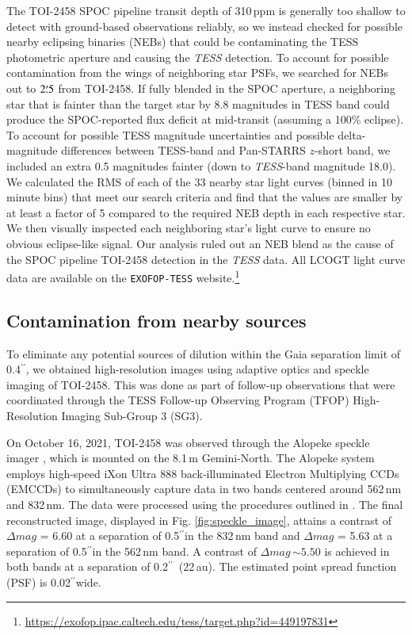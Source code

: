 \documentclass[traditabstract,longauth]{aa}
\providecommand{\arcsec}{$^{\prime \prime}$}
\begin{document}
The TOI-2458 SPOC pipeline transit depth of 310\,ppm is generally too shallow to detect with ground-based observations reliably, so we instead checked for possible nearby eclipsing binaries (NEBs) that could be contaminating the TESS photometric aperture and causing the \textit{TESS} detection. To account for possible contamination from the wings of neighboring star PSFs, we searched for NEBs out to $2\overset{\prime}{.}5$ from TOI-2458. If fully blended in the SPOC aperture, a neighboring star that is fainter than the target star by 8.8 magnitudes in TESS band could produce the SPOC-reported flux deficit at mid-transit (assuming a 100\% eclipse). To account for possible TESS magnitude uncertainties and possible delta-magnitude differences between TESS-band and Pan-STARRS $z$-short band, we included an extra 0.5 magnitudes fainter (down to \textit{TESS}-band magnitude 18.0). We calculated the RMS of each of the 33 nearby star light curves (binned in 10 minute bins) that meet our search criteria and find that the values are smaller by at least a factor of 5 compared to the required NEB depth in each respective star. We then visually inspected each neighboring star's light curve to ensure no obvious eclipse-like signal. Our analysis ruled out an NEB blend as the cause of the SPOC pipeline TOI-2458 detection in the \textit{TESS} data. All LCOGT light curve data are available on the {\tt EXOFOP-TESS} website.\footnote{\href{https://exofop.ipac.caltech.edu/tess/target.php?id=449197831}{https://exofop.ipac.caltech.edu/tess/target.php?id=449197831}}

\subsection{Contamination from nearby sources}\label{sec:ao_image}

To eliminate any potential sources of dilution within the Gaia separation limit of 0.4\arcsec, we obtained high-resolution images using adaptive optics and speckle imaging of TOI-2458. This was done as part of follow-up observations that were coordinated through the TESS Follow-up Observing Program (TFOP) High-Resolution Imaging Sub-Group 3 (SG3).

On October 16, 2021, TOI-2458 was observed through the Alopeke speckle imager \citep{Scott18}, which is mounted on the 8.1\,m Gemini-North. The Alopeke system employs high-speed iXon Ultra 888 back-illuminated Electron Multiplying CCDs (EMCCDs) to simultaneously capture data in two bands centered around 562\,nm and 832\,nm. The data were processed using the procedures outlined in \citet{Howell11}. The final reconstructed image, displayed in Fig. \ref{fig:speckle_image}, attains a contrast of ${\Delta}mag$ = 6.60 at a separation of 0.5\arcsec in the 832\,nm band and ${\Delta}mag$ = 5.63 at a separation of 0.5\arcsec in the 562\,nm band. A contrast of ${\Delta}mag$\,$\sim5.50$ is achieved in both bands at a separation of 0.2\arcsec\, (22\,au). The estimated point spread function (PSF) is 0.02\arcsec wide.
\end{document}
